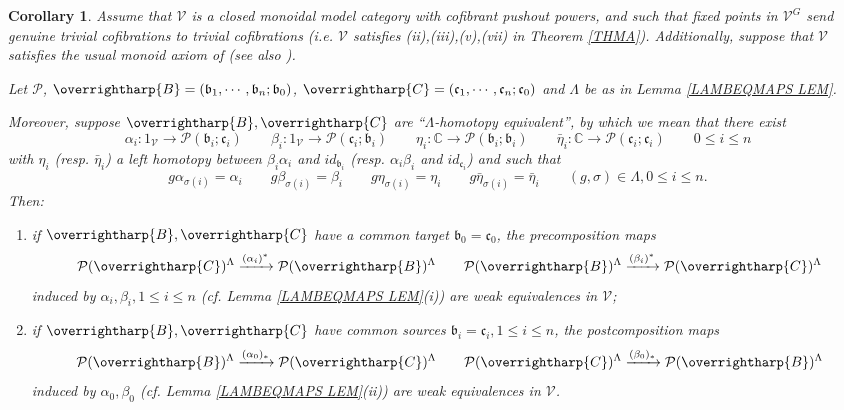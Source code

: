 \documentclass[a4paper,10pt
 ,final
]{article}%
\numberwithin{equation}{section}
\numberwithin{figure}{section}
\newtheorem{corollary}[equation]{Corollary}%
\theoremstyle{definition} %
\newcommand{\vect}[1]{\text{\overrightharp{\ensuremath{#1}}}}
\newcommand{\V}{\ensuremath{\mathcal V}}
\renewcommand{\P}{\ensuremath{\mathcal P}}
\newcommand{\1}{\ensuremath{\mathbbm 1}}%
\begin{document}
\begin{corollary}\label{ALBEETA COR}
Assume that $\V$ is a closed monoidal model category with cofibrant pushout powers,
and such that fixed points in $\V^G$ send genuine trivial cofibrations to trivial cofibrations
(i.e. $\V$ satisfies (ii),(iii),(v),(vii) in Theorem \ref{THMA}). Additionally, suppose 
that $\V$ satisfies the usual monoid axiom of \cite{SS00} (see also \cite[Rem. \ref{OC-MONAX_REM}]{BP_FCOP}).
      
Let $\P$, 
$\vect{B}=(\mathfrak{b}_1,\cdots,\mathfrak{b}_n;\mathfrak{b}_0)$,
$\vect{C}=(\mathfrak{c}_1,\cdots,\mathfrak{c}_n;\mathfrak{c}_0)$ 
and $\Lambda$ be as in 
Lemma \ref{LAMBEQMAPS LEM}.

Moreover, suppose 
$\vect{B},\vect{C}$
are ``$\Lambda$-homotopy equivalent'',
by which we mean that there exist 
\[
\alpha_i \colon 1_{\V} \to \P(\mathfrak{b}_i;\mathfrak{c}_i)
\qquad 
\beta_i \colon 1_{\V} \to \P(\mathfrak{c}_i;\mathfrak{b}_i)
\qquad
\eta_i \colon \mathbb{C} \to \P(\mathfrak{b}_i;\mathfrak{b}_i)
\qquad
\bar{\eta}_i \colon \mathbb{C} \to \P(\mathfrak{c}_i;\mathfrak{c}_i)
\qquad
0\leq i \leq n
\] 
with $\eta_i$ (resp. $\bar{\eta}_i$) a left homotopy between 
$\beta_i\alpha_i$ and $id_{\mathfrak{b}_i}$
(resp. 
$\alpha_i\beta_i$ and $id_{\mathfrak{c}_i}$)
and such that
\[
g \alpha_{\sigma(i)} = \alpha_i \qquad
g \beta_{\sigma(i)} = \beta_i \qquad
g \eta_{\sigma(i)} = \eta_i \qquad
g \bar{\eta}_{\sigma(i)} = \bar{\eta}_i \qquad
(g,\sigma) \in \Lambda,0\leq i \leq n.
\]
Then:
\begin{enumerate}[label=(\roman*)]
\item if $\vect{B},\vect{C}$ have a common target $\mathfrak{b}_0=\mathfrak{c}_0$, the precomposition maps
\[
\P(\vect{C})^{\Lambda} \xrightarrow{(\alpha_i)^{\**}} \P(\vect{B})^{\Lambda}
\qquad
\P(\vect{B})^{\Lambda} \xrightarrow{(\beta_i)^{\**}}
\P(\vect{C})^{\Lambda}
\]
induced by $\alpha_i,\beta_i,1\leq i \leq n$ 
(cf. Lemma \ref{LAMBEQMAPS LEM}(i)) are weak equivalences in $\V$;
\item if $\vect{B},\vect{C}$ have common sources $\mathfrak{b}_i=\mathfrak{c}_i, 1 \leq i \leq n$, the postcomposition maps
\[
\P(\vect{B})^{\Lambda} \xrightarrow{(\alpha_0)_{\**}}
\P(\vect{C})^{\Lambda}
\qquad
\P(\vect{C})^{\Lambda} \xrightarrow{(\beta_0)_{\**}}
\P(\vect{B})^{\Lambda}
\]
induced by $\alpha_0,\beta_0$
(cf. Lemma \ref{LAMBEQMAPS LEM}(ii))
are weak equivalences in $\V$.
\end{enumerate}
\end{corollary}
\end{document}
